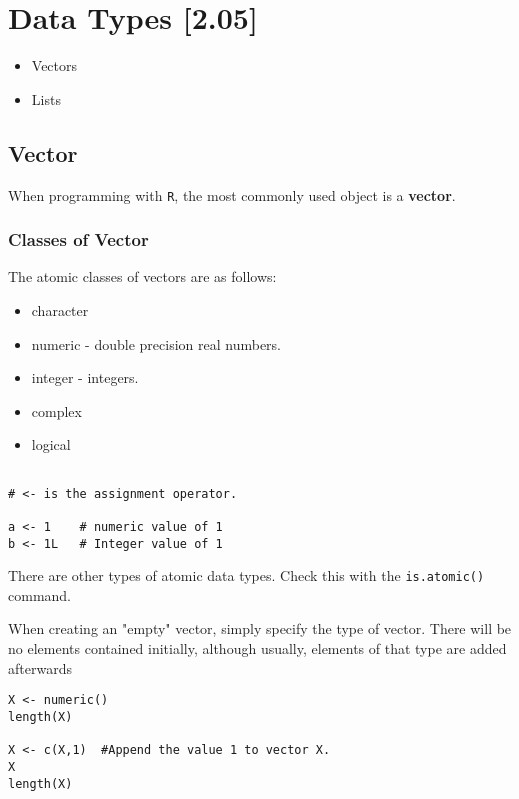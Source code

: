 \documentclass[a4paper,12pt]{article}
\begin{document}
\section*{Data Types [2.05]}

\begin{itemize}
\item Vectors
\item Lists
\end{itemize}

\subsection*{Vector}
When programming with \texttt{R}, the most commonly used object is a \textbf{vector}.

\subsubsection*{Classes of Vector}
The atomic classes of vectors are as follows:
\begin{itemize}
\item character
\item numeric - double precision real numbers.
\item integer - integers.
\item complex
\item logical
\end{itemize}
\begin{framed}
\begin{verbatim}

# <- is the assignment operator.

a <- 1    # numeric value of 1
b <- 1L   # Integer value of 1
\end{verbatim}
\end{framed}


There are other types of atomic data types. Check this with the \texttt{is.atomic()} command.


When creating an "empty" vector, simply specify the type of vector. There will be no elements contained initially, although usually, elements of that type are added afterwards

\begin{framed}
\begin{verbatim}
X <- numeric()
length(X)

X <- c(X,1)  #Append the value 1 to vector X.
X
length(X)

\end{verbatim}
\end{framed}
\end{document}
